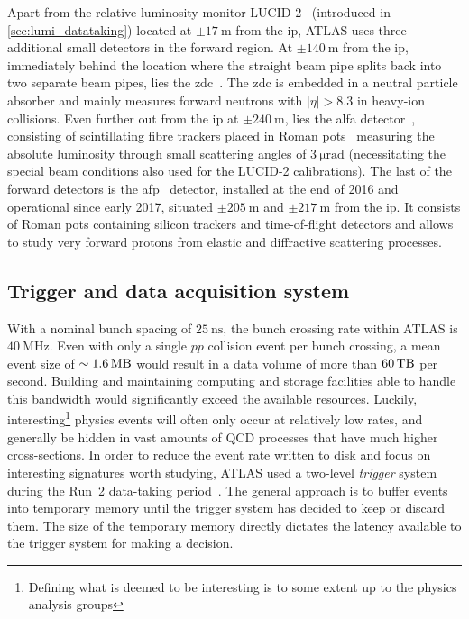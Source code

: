 Apart from the relative luminosity monitor LUCID-2~\cite{Avoni_2018} (introduced in \cref{sec:lumi_datataking}) located at $\pm \SI{17}{\meter}$ from the \gls{ip}, ATLAS uses three additional small detectors in the forward region. At $\pm \SI{140}{\meter}$ from the \gls{ip}, immediately behind the location where the straight beam pipe splits back into two separate beam pipes, lies the \gls{zdc}~\cite{Leite:1628749}. The \gls{zdc} is embedded in a neutral particle absorber and mainly measures forward neutrons with $\vert\eta\vert > 8.3$ in heavy-ion collisions. Even further out from the \gls{ip} at $\pm \SI{240}{\meter}$, lies the \gls{alfa} detector~\cite{AbdelKhalek:2016tiv}, consisting of scintillating fibre trackers placed in Roman pots~\cite{AMALDI1977390} measuring the absolute luminosity through small scattering angles of $\SI{3}{\micro\radian}$ (necessitating the special beam conditions also used for the LUCID-2 calibrations). The last of the forward detectors is the \gls{afp}~\cite{Adamczyk:2017378} detector, installed at the end of 2016 and operational since early 2017, situated $\pm\SI{205}{\meter}$ and $\pm\SI{217}{\meter}$ from the \gls{ip}. It consists of Roman pots containing silicon trackers and time-of-flight detectors and allows to study very forward protons from elastic and diffractive scattering processes.

\subsection{Trigger and data acquisition system}\label{sec:trigger}

With a nominal bunch spacing of $\SI{25}{\nano\second}$, the bunch crossing rate within ATLAS is $\SI{40}{\MHz}$. Even with only a single $pp$ collision event per bunch crossing, a mean event size of $\sim \SI{1.6}{\mega\byte}$ would result in a data volume of more than $\SI{60}{\tera\byte}$ per second. Building and maintaining computing and storage facilities able to handle this bandwidth would significantly exceed the available resources. Luckily, interesting\footnote{Defining what is deemed to be interesting is to some extent up to the physics analysis groups} physics events will often only occur at relatively low rates, and generally be hidden in vast amounts of QCD processes that have much higher cross-sections. In order to reduce the event rate written to disk and focus on interesting signatures worth studying, ATLAS used a two-level \textit{trigger} system during the Run~2 data-taking period~\cite{Martinez:2016udm}. The general approach is to buffer events into temporary memory until the trigger system has decided to keep or discard them. The size of the temporary memory directly dictates the latency available to the trigger system for making a decision.

